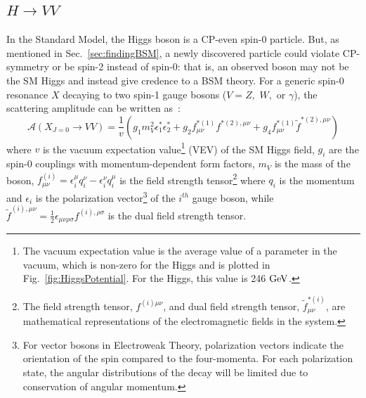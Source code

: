 \subsection{$H\rightarrow VV$}
\label{sec:HVVDecay}

In the Standard Model, the Higgs boson is a CP-even spin-0 particle. But, as mentioned in Sec.~\ref{sec:findingBSM}, a newly discovered particle could violate CP-symmetry or be spin-2 instead of spin-0: that is, an observed boson may not be the SM Higgs and instead give credence to a BSM theory. For a generic spin-0 resonance $X$ decaying to two spin-1 gauge bosons ($V=Z,$ $W,$ or $\gamma$), the scattering amplitude can be written as~\cite{Gao:2010qx}:
\begin{equation}
  \mathcal{A}(X_{J=0} \rightarrow VV) = \frac{1}{v}\left(g_1m_V^2\epsilon_1^*\epsilon_2^*+g_2f_{\mu\nu}^{*(1)}f^{*(2),\mu\nu}+g_4f_{\mu\nu}^{*(1)}\tilde{f}^{*(2),\mu\nu}\right)
\label{eq:scalarAmp_gform}
\end{equation}
where $v$ is the vacuum expectation value\footnote{The vacuum expectation value is the average value of a parameter in the vacuum, which is non-zero for the Higgs and is plotted in Fig.~\ref{fig:HiggsPotential}. For the Higgs, this value is 246 $\rm{GeV}$.} (VEV) of the SM Higgs field, $g_i$ are the spin-0 couplings with momentum-dependent form factors, $m_V$ is the mass of the boson, $f_{\mu\nu}^{(i)}=\epsilon_i^\mu q_i^\nu - \epsilon_i^\nu q_i^\mu$ is the field strength tensor\footnote{The field strength tensor, $f^{(i)\mu\nu}$, and dual field strength tensor, $\tilde{f}^{*(i)}_{\mu\nu}$, are mathematical representations of the electromagnetic fields in the system.} where $q_i$ is the momentum and $\epsilon_i$ is the polarization vector\footnote{For vector bosons in Electroweak Theory, polarization vectors indicate the orientation of the spin compared to the four-momenta. For each polarization state, the angular distributions of the decay will be limited due to conservation of angular momentum.} of the $i^{th}$ gauge boson, while $\tilde{f}^{(i),\mu\nu}=\frac{1}{2}\epsilon_{\mu\nu\rho\sigma}f^{(i),\rho\sigma}$ is the dual field strength tensor.

